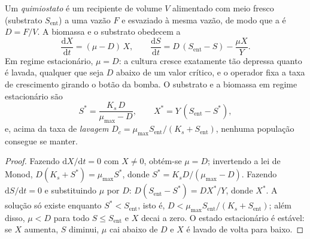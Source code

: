 \begin{theorem}[O quimiostato]\label{thm:b2:microbial-metabolism:chemostat}
Um \emph{quimiostato} é um recipiente de volume $V$ alimentado com meio
fresco (substrato $S_{\text{ent}}$) a uma vazão $F$ e esvaziado à mesma
vazão, de modo que a \emph{} é $D = F/V$. A biomassa e
o substrato obedecem a
\[
\frac{\mathrm{d}X}{\mathrm{d}t} = (\mu - D)\,X, \qquad
\frac{\mathrm{d}S}{\mathrm{d}t} = D\,(S_{\text{ent}} - S) - \frac{\mu X}{Y}.
\]
Em regime estacionário, $\mu = D$: a cultura cresce exatamente tão
depressa quanto é lavada, qualquer que seja $D$ abaixo de um valor
crítico, e o operador fixa a taxa de crescimento girando o botão da
bomba. O substrato e a biomassa em regime estacionário são
\[
S^* = \frac{K_s\,D}{\mu_{\max} - D}, \qquad X^* = Y\,(S_{\text{ent}} - S^*),
\]
e, acima da taxa de \emph{lavagem} $D_c = \mu_{\max}
S_{\text{ent}}/(K_s + S_{\text{ent}})$, nenhuma população consegue se
manter.
\end{theorem}
\begin{proof}
Fazendo $\mathrm{d}X/\mathrm{d}t = 0$ com $X \neq 0$, obtém-se
$\mu = D$; invertendo a lei de Monod, $D(K_s + S^*) = \mu_{\max} S^*$,
donde $S^* =
K_s D/(\mu_{\max} - D)$. Fazendo $\mathrm{d}S/\mathrm{d}t = 0$ e
substituindo $\mu$ por $D$: $D(S_{\text{ent}} - S^*) = DX^*/Y$, donde
$X^*$. A solução só existe enquanto $S^* < S_{\text{ent}}$, isto é,
$D < \mu_{\max} S_{\text{ent}}/(K_s + S_{\text{ent}})$; além disso,
$\mu < D$ para todo $S \le S_{\text{ent}}$ e $X$ decai a zero. O estado
estacionário é estável: se $X$ aumenta, $S$ diminui, $\mu$ cai abaixo
de $D$ e $X$ é lavado de volta para baixo.
\end{proof}

